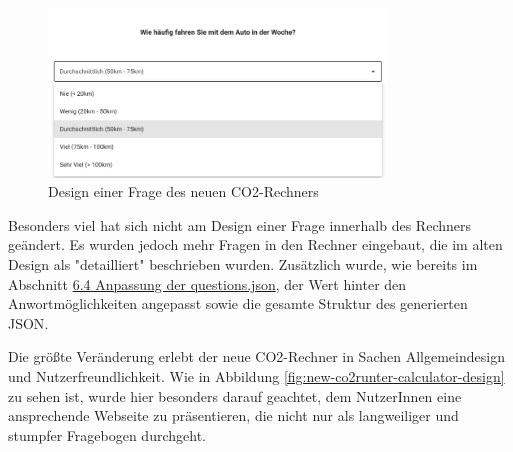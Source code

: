 \begin{figure}[H]
    \centering
    \includegraphics[width=0.8\textwidth]{images/06/Question_New_Design.png}
    \caption{Design einer Frage des neuen CO2-Rechners}
    \label{fig:new-co2runter-question-design}
\end{figure}

Besonders viel hat sich nicht am Design einer Frage innerhalb des Rechners geändert.
Es wurden jedoch mehr Fragen in den Rechner eingebaut, die im alten Design als "detailliert" beschrieben wurden.
Zusätzlich wurde, wie bereits im Abschnitt \hyperref[sec:anpassung-der-questions-json]{6.4 Anpassung der questions.json}, der Wert hinter den Anwortmöglichkeiten angepasst sowie die gesamte Struktur des generierten \acs{JSON}.

Die größte Veränderung erlebt der neue CO2-Rechner in Sachen Allgemeindesign und Nutzerfreundlichkeit.
Wie in Abbildung \ref{fig:new-co2runter-calculator-design} zu sehen ist, wurde hier besonders darauf geachtet, dem NutzerInnen eine ansprechende Webseite zu präsentieren, die nicht nur als langweiliger und stumpfer Fragebogen durchgeht.


